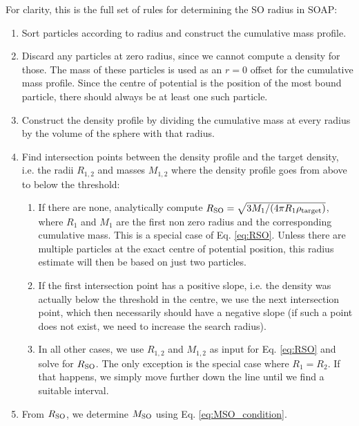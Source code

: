 \documentclass{article}
\begin{document}
For clarity, this is the full set of rules for determining the SO radius in SOAP:
\begin{enumerate}
    \item Sort particles according to radius and construct the cumulative mass profile.
    \item Discard any particles at zero radius, since we cannot compute a density for those. The mass of these 
    particles is used as an $r=0$ offset for the cumulative mass profile. Since the centre of potential is the 
    position of the most bound particle, there should always be at least one such particle.
    \item Construct the density profile by dividing the cumulative mass at every radius by the volume of the 
    sphere with that radius.
    \item Find intersection points between the density profile and the target density, i.e. the radii 
    $R_{1,2}$ and masses $M_{1,2}$ where the density profile goes from above to below the threshold:
    \begin{enumerate}
        \item If there are none, analytically compute $R_{\rm{}SO}=\sqrt{3M_1/(4\pi{}R_1\rho_{\rm{}target})}$, 
        where $R_1$ and $M_1$ are the first non zero radius and the corresponding cumulative mass. This is a 
        special case of Eq. \ref{eq:RSO}. Unless there are multiple particles at the exact centre of potential 
        position, this radius estimate will then be based on just two particles.
        \item If the first intersection point has a positive slope, i.e. the density was actually below the 
        threshold in the centre, we use the next intersection point, which then necessarily should have a 
        negative slope (if such a point does not exist, we need to increase the search radius).
        \item In all other cases, we use $R_{1,2}$ and $M_{1,2}$ as input for Eq. \ref{eq:RSO} and solve for 
        $R_{\rm{}SO}$. The only exception is the special case where $R_1 = R_2$. If that happens, we simply 
        move further down the line until we find a suitable interval.

    \end{enumerate}
    \item From $R_{\rm{}SO}$, we determine $M_{\rm{}SO}$ using Eq. \ref{eq:MSO_condition}.
\end{enumerate}
\end{document}
